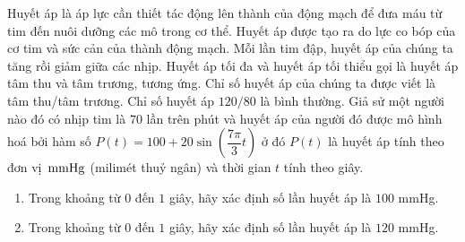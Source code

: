 \begin{ex}%
	 Huyết áp là áp lực cần thiết tác động lên thành của động mạch để đưa máu từ tim đến nuôi dưỡng các mô trong cơ thể. Huyết áp được tạo ra do lực co bóp của cơ tim và sức cản của thành động mạch. Mỗi lần tim đập, huyết áp của chúng ta tăng rồi giảm giữa các nhịp. Huyết áp tối đa và huyết áp tối thiểu gọi là huyết áp tâm thu và tâm trương, tương ứng. Chỉ số huyết áp của chúng ta được viết là tâm thu/tâm trương. Chỉ số huyết áp $120/80$ là bình thường. Giả sử một người nào đó có nhịp tim là $70$ lần trên phút và huyết áp của người đó được mô hình hoá bởi hàm số $P(t)=100+20\sin \left( \dfrac{7\pi}{3}t \right)$ ở đó $P(t)$ là huyết áp tính theo đơn vị $\rm\,mmHg$ (milimét thuỷ ngân) và thời gian $t$ tính theo giây.
	\begin{enumerate}
		\item Trong khoảng từ $0$ đến $1$ giây,  hãy xác định số lần huyết áp là $100$ mmHg.
		\item Trong khoảng từ $0$ đến $1$ giây, hãy xác  định số lần huyết áp là $120$ mmHg.
	\end{enumerate}
\end{ex}

